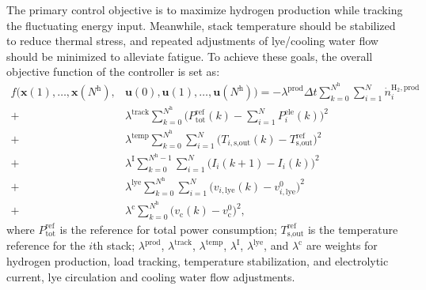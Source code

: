 \documentclass[review,3p,10pt]{elsarticle}
\begin{document}
The primary control objective is to maximize hydrogen production %
while tracking the fluctuating energy input. Meanwhile, stack temperature should be stabilized to reduce thermal stress, and repeated adjustments of lye/cooling water flow should be minimized to alleviate fatigue. To achieve these goals, the overall objective function of the controller is set as:
\begin{align}
  f\big( \bm{x}(1), \ldots, \bm{x}(N^\text{h}), & \bm{u}(0), \bm{u}(1), \ldots, \bm{u}(N^\text{h}) \big) = - \lambda^{\text{prod}} \Delta t \sum\nolimits_{k=0}^{N^\text{h}} \sum\nolimits_{i=1}^{N} \dot{n}_{i}^{\text{H}_2,\text{prod}}  \nonumber \\
  + & \lambda^{\text{track}} \sum\nolimits_{k=0}^{N^\text{h}} \Big( P_{\text{tot}}^{\text{ref}}(k) - \sum\nolimits_{i=1}^{N} P_{i}^{\text{ele}}(k) \Big)^2  \nonumber \\
  + & \lambda^{\text{temp}} \sum\nolimits_{k=0}^{N^\text{h}} \sum\nolimits_{i=1}^{N} \Big( T_{i,\text{s,out}}(k) -  T_{\text{s,out}}^{\text{ref}} \Big)^2  \nonumber \\
  + & \lambda^{\text{I}} \sum\nolimits_{k=0}^{N^\text{h}-1} \sum\nolimits_{i=1}^{N} \Big( I_{i}(k+1) -  I_{i}(k) \Big)^2  \nonumber \\
  + & \lambda^{\text{lye}} \sum\nolimits_{k=0}^{N^\text{h}} \sum\nolimits_{i=1}^{N} \Big( v_{i,\text{lye}}(k) -  v_{i,\text{lye}}^{\text{0}} \Big)^2  \nonumber \\
  + & \lambda^{\text{c}} \sum\nolimits_{k=0}^{N^\text{h}}  \Big( v_{\text{c}}(k) -  v_{\text{c}}^{0} \Big)^2,
   \label{eq:obj}
\end{align}
\noindent
where $P_{\text{tot}}^{\text{ref}}$ is the reference for total power consumption; $T_{\text{s,out}}^{\text{ref}}$ is the temperature reference for the $i$th stack; $\lambda^{\text{prod}}$, $\lambda^{\text{track}}$, $\lambda^{\text{temp}}$, $\lambda^{\text{I}}$, $\lambda^{\text{lye}}$, and $\lambda^{\text{c}}$  are weights for hydrogen production, load tracking, temperature stabilization, and electrolytic current, lye circulation and cooling water flow adjustments.
\end{document}
